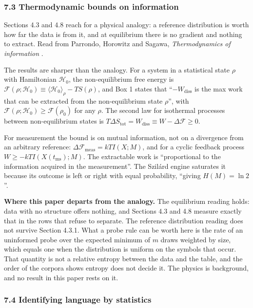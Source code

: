 \subsubsection{7.3 Thermodynamic bounds on information}

Sections 4.3 and 4.8 reach for a physical analogy: a reference distribution is worth how far the data is from it, and at equilibrium there is no gradient and nothing to extract. Read from Parrondo, Horowitz and Sagawa, \emph{Thermodynamics of information} \cite{src:Parrondo}.

The results are sharper than the analogy. For a system in a statistical state \(\rho\) with Hamiltonian \(\mathcal{H}_0\), the non-equilibrium free energy is \(\mathcal{F}(\rho;\mathcal{H}_0) \equiv \langle \mathcal{H}_0\rangle_\rho - TS(\rho)\), and Box 1 states that ``\(-W_{\text{diss}}\) is the max work that can be extracted from the non-equilibrium state \(\rho\)'', with \(\mathcal{F}(\rho;\mathcal{H}_0) \ge \mathcal{F}(\rho_0)\) for any \(\rho\). The second law for isothermal processes between non-equilibrium states is \(T\Delta S_{\text{tot}} = W_{\text{diss}} \equiv W - \Delta\mathcal{F} \ge 0\).

For measurement the bound is on mutual information, not on a divergence from an arbitrary reference: \(\Delta \mathcal{F}_{\text{meas}} = kTI(X;M)\), and for a cyclic feedback process \(W \ge -kTI(X(t_{\text{ms}});M)\). The extractable work is ``proportional to the information acquired in the measurement''. The Szilárd engine saturates it because its outcome is left or right with equal probability, ``giving \(H(M) = \ln 2\)''.

\noindent\textbf{Where this paper departs from the analogy.} The equilibrium reading holds: data with no structure offers nothing, and Sections 4.3 and 4.8 measure exactly that in the rows that refuse to separate. The reference distribution reading does not survive Section 4.3.1. What a probe rule can be worth here is the rate of an uninformed probe over the expected minimum of \(m\) draws weighted by size, which equals one when the distribution is uniform on the symbols that occur. That quantity is not a relative entropy between the data and the table, and the order of the corpora shows entropy does not decide it. The physics is background, and no result in this paper rests on it.

\subsubsection{7.4 Identifying language by statistics}

